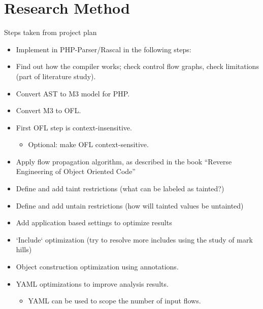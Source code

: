 \documentclass[../main.tex]{subfiles}
\begin{document}
    \section{Research Method}\label{sec:research_method}
    
    Steps taken from project plan
    \begin{itemize}[noitemsep,nolistsep]
        \item Implement in PHP-Parser/Rascal in the following steps:
        \item Find out how the compiler works; check control flow graphs, check limitations (part of literature study).
        \item Convert AST to M3 model for PHP.
        \item Convert M3 to OFL.
        \item First OFL step is context-insensitive.
        \begin{itemize}[noitemsep,nolistsep]
            \item Optional: make OFL context-sensitive.
        \end{itemize}
        \item Apply flow propagation algorithm, as described in the book “Reverse Engineering of Object Oriented Code”
        \item Define and add taint restrictions (what can be labeled as tainted?)
        \item Define and add untain restrictions (how will tainted values be untainted)
        \item Add application based settings to optimize results
        \item `Include` optimization (try to resolve more includes using the study of mark hills)
        \item Object construction optimization using annotations.
        \item YAML optimizations to improve analysis results.
        \begin{itemize}[noitemsep,nolistsep]
            \item YAML can be used to scope the number of input flows.
        \end{itemize}

\end{itemize}
\end{document}
